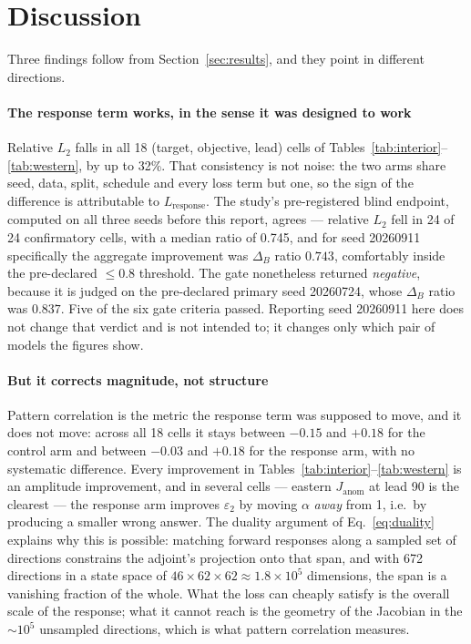 \documentclass[3p,12pt]{elsarticle}
\begin{document}
\section{Discussion}
\label{sec:discussion}

Three findings follow from Section~\ref{sec:results}, and they point in different
directions.

\paragraph{The response term works, in the sense it was designed to work}
Relative $L_2$ falls in all 18 (target, objective, lead) cells of
Tables~\ref{tab:interior}--\ref{tab:western}, by up to 32\%. That consistency is
not noise: the two arms share seed, data, split, schedule and every loss term but
one, so the sign of the difference is attributable to $L_{\mathrm{response}}$.
The study's pre-registered blind endpoint, computed on all three seeds before
this report, agrees --- relative $L_2$ fell in 24 of 24 confirmatory cells, with
a median ratio of 0.745, and for seed 20260911 specifically the aggregate
improvement was $\Delta_B$ ratio $0.743$, comfortably inside the pre-declared
$\le0.8$ threshold. The gate nonetheless returned \emph{negative}, because it is
judged on the pre-declared primary seed 20260724, whose $\Delta_B$ ratio was
$0.837$. Five of the six gate criteria passed. Reporting seed 20260911 here does
not change that verdict and is not intended to; it changes only which pair of
models the figures show.

\paragraph{But it corrects magnitude, not structure} Pattern correlation is the
metric the response term was supposed to move, and it does not move: across all
18 cells it stays between $-0.15$ and $+0.18$ for the control arm and between
$-0.03$ and $+0.18$ for the response arm, with no systematic difference. Every
improvement in Tables~\ref{tab:interior}--\ref{tab:western} is an amplitude
improvement, and in several cells --- eastern $J_{\mathrm{anom}}$ at lead 90 is
the clearest --- the response arm improves $\varepsilon_2$ by moving $\alpha$
\emph{away} from 1, i.e.\ by producing a smaller wrong answer. The duality
argument of Eq.~\eqref{eq:duality} explains why this is possible: matching
forward responses along a sampled set of directions constrains the adjoint's
projection onto that span, and with 672 directions in a state space of
$46\times62\times62\approx1.8\times10^{5}$ dimensions, the span is a vanishing
fraction of the whole. What the loss can cheaply satisfy is the overall scale of
the response; what it cannot reach is the geometry of the Jacobian in the
$\sim10^{5}$ unsampled directions, which is what pattern correlation measures.
\end{document}
